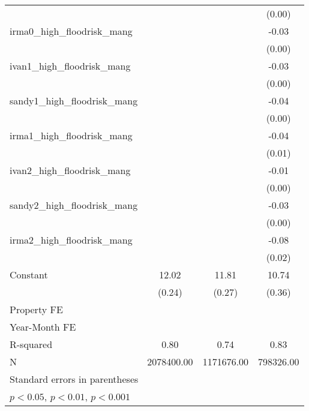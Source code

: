 {\begin{tabular}{l*{3}{c}}
                    &                     &                     &      (0.00)         \\
[1em]
irma0\_high\_floodrisk\_mang&                     &                     &       -0.03\sym{***}\\
                    &                     &                     &      (0.00)         \\
[1em]
ivan1\_high\_floodrisk\_mang&                     &                     &       -0.03\sym{***}\\
                    &                     &                     &      (0.00)         \\
[1em]
sandy1\_high\_floodrisk\_mang&                     &                     &       -0.04\sym{***}\\
                    &                     &                     &      (0.00)         \\
[1em]
irma1\_high\_floodrisk\_mang&                     &                     &       -0.04\sym{***}\\
                    &                     &                     &      (0.01)         \\
[1em]
ivan2\_high\_floodrisk\_mang&                     &                     &       -0.01\sym{**} \\
                    &                     &                     &      (0.00)         \\
[1em]
sandy2\_high\_floodrisk\_mang&                     &                     &       -0.03\sym{***}\\
                    &                     &                     &      (0.00)         \\
[1em]
irma2\_high\_floodrisk\_mang&                     &                     &       -0.08\sym{***}\\
                    &                     &                     &      (0.02)         \\
[1em]
Constant            &       12.02\sym{***}&       11.81\sym{***}&       10.74\sym{***}\\
                    &      (0.24)         &      (0.27)         &      (0.36)         \\
\hline
Property FE         &                     &                     &                     \\
Year-Month FE       &                     &                     &                     \\
R-squared           &        0.80         &        0.74         &        0.83         \\
N                   &  2078400.00         &  1171676.00         &   798326.00         \\
\hline\hline
\multicolumn{4}{l}{\footnotesize Standard errors in parentheses}\\
\multicolumn{4}{l}{\footnotesize \sym{*} \(p<0.05\), \sym{**} \(p<0.01\), \sym{***} \(p<0.001\)}\\
\end{tabular}
}
